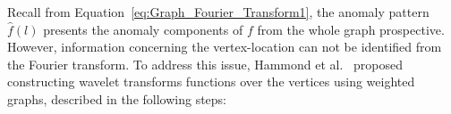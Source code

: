 \documentclass[conference]{IEEEtran}
\begin{document}

Recall from Equation~\ref{eq:Graph_Fourier_Transform1}, the anomaly pattern $\hat{f}(l)$ presents the anomaly components of $f$ from the whole graph prospective. However, information concerning the vertex-location can not be identified from the Fourier transform. To address this issue, Hammond et al.~\cite{hammond2011wavelets} proposed constructing wavelet transforms functions over the vertices using weighted graphs, described in the following steps:
\end{document}
